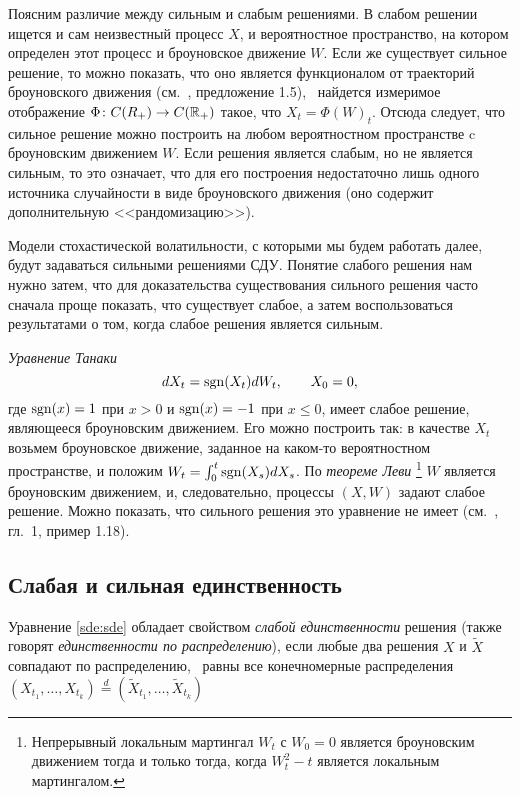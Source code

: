 Поясним различие между сильным и слабым решениями.
В слабом решении ищется и сам неизвестный процесс $X$, и вероятностное пространство, на котором определен этот процесс и броуновское движение $W$.
Если же существует сильное решение, то можно показать, что оно является функционалом от траекторий броуновского движения (см.\ \cite{ChernyEngelbert}, предложение 1.5), \te\ найдется измеримое отображение $\Phi\colon C(R_+) \to C(\mathbb{R}_+)$ такое, что $X_t = \Phi(W)_t$.
Отсюда следует, что сильное решение можно построить на любом вероятностном пространстве c броуновским движением $W$.
Если решения является слабым, но не является сильным, то это означает, что для его построения недостаточно лишь одного источника случайности в виде броуновского движения (оно содержит дополнительную <<рандомизацию>>).

Модели стохастической волатильности, с которыми мы будем работать далее, будут задаваться сильными решениями СДУ.
Понятие слабого решения нам нужно затем, что для доказательства существования сильного решения часто сначала проще показать, что существует слабое, а затем воспользоваться результатами о том, когда слабое решения является сильным.

\begin{example}
\emph{Уравнение Танаки} 
\[
dX_t = \operatorname{sgn}(X_t) d W_t, \qquad X_0=0,
\]
где $\operatorname{sgn}(x) = 1$ при $x> 0$ и $\operatorname{sgn}(x) = -1$ при $x\le0$, имеет слабое решение, являющееся броуновским движением. Его можно построить так: в качестве $X_t$ возьмем броуновское движение, заданное на каком-то вероятностном пространстве, и положим $W_t = \int_0^t \operatorname{sgn}(X_s) d X_s$. По \emph{теореме Леви}%
\footnote{Непрерывный локальным мартингал $W_t$ с $W_0=0$ является броуновским движением тогда и только тогда, когда $W_t^2 - t$ является локальным мартингалом.}
$W$ является броуновским движением, и, следовательно, процессы $(X,W)$ задают слабое решение.
Можно показать, что сильного решения это уравнение не имеет (см.~\cite{ChernyEngelbert}, гл.~1, пример 1.18).
\end{example}


\subsection{Слабая и сильная единственность}

\begin{definition}
Уравнение \eqref{sde:sde} обладает свойством \emph{слабой единственности} решения (также говорят \emph{единственности по распределению}), если любые два решения $X$ и $\tilde X$ совпадают по распределению, \te\ равны все конечномерные распределения $(X_{t_1},\dots,X_{t_k}) \stackrel{d}{=} (\tilde X_{t_1},\dots,\tilde X_{t_k})$
\end{definition}

